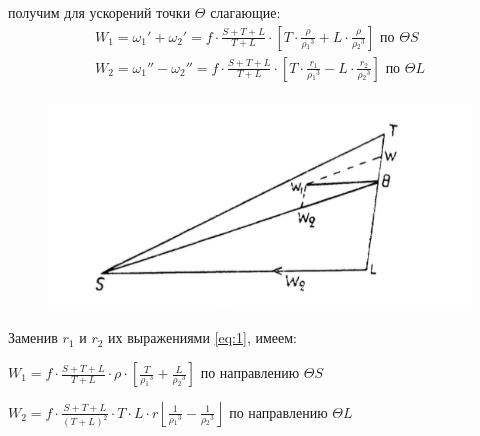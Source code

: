 \documentclass[a4paper,12pt]{book}
\begin{document}
%
получим для ускорений точки $\Theta$ слагающие:
%
\begin{equation*}
\begin{aligned}
	W_1 = \omega_1' + \omega_2' = f \cdot \frac{S+T+L}{T+L} \cdot
		\left[
			T \cdot \displaystyle \frac{\rho}{\rho{_1}^3} + L \cdot \displaystyle \frac{\rho}{\rho{_2}^3}
		\right] \text{ по } \Theta S
	\\
	W_2 = \omega_1'' - \omega_2'' = f \cdot \frac{S+T+L}{T+L} \cdot
		\left[
			T \cdot \displaystyle \frac{r_1}{\rho{_1}^3} - L \cdot \displaystyle \frac{r_2}{\rho{_2}^3}
		\right] \text{ по } \Theta L \\
\end{aligned}
\end{equation*}
%
\begin{figure}[H]
	\centering
	\includegraphics{23.png}
	\caption{}
	\label{fig:noname_3}
\end{figure}

Заменив $r_1$ и $r_2$ их выражениями \eqref{eq:1}, имеем:

$W_1 = f \cdot \displaystyle \frac{S+T+L}{T+L} \cdot \rho \cdot \left[ \displaystyle \frac{T}{\rho{_1}^3} + \displaystyle \frac{L}{\rho{_2}^3} \right]$ по направлению $\Theta S$

$W_2 = f \cdot \displaystyle \frac{S+T+L}{(T+L)^2} \cdot T \cdot L \cdot r 
\left\lfloor \frac{1}{\rho{_1}^3} - \frac{1}{\rho{_2}^3} \right\rfloor$ по направлению $\Theta L$
\end{document}
